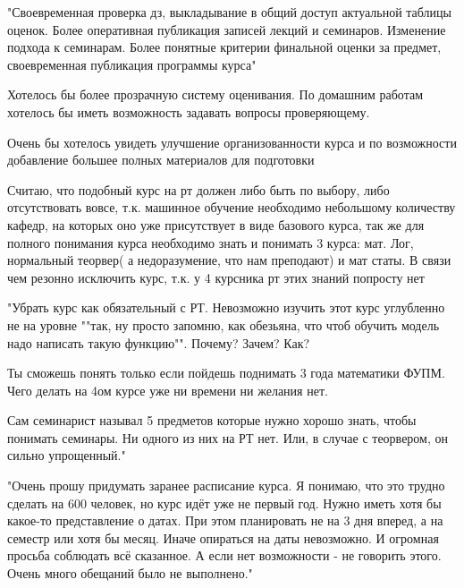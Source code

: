        \begin{commentbox}
            "Своевременная проверка дз, выкладывание в общий доступ актуальной таблицы оценок.
            Более оперативная публикация записей лекций и семинаров.
            Изменение подхода к семинарам.
            Более понятные критерии финальной оценки за предмет, своевременная публикация программы курса"
        \end{commentbox}

        \begin{commentbox}
            Хотелось бы более прозрачную систему оценивания. По домашним работам хотелось бы иметь возможность задавать вопросы проверяющему.
        \end{commentbox}

        \begin{commentbox}
            Очень бы хотелось увидеть улучшение  организованности курса и по возможности добавление большее полных материалов для подготовки
        \end{commentbox}

        \begin{commentbox}
            Считаю, что подобный курс на рт должен либо быть по выбору, либо отсутствовать вовсе, т.к. машинное обучение необходимо небольшому количеству кафедр, на которых оно уже присутствует в виде базового курса, так же для полного понимания курса необходимо знать и понимать 3 курса: мат. Лог, нормальный теорвер( а недоразумение, что нам преподают) и мат статы. В связи чем  резонно исключить курс, т.к. у 4 курсника рт этих знаний попросту нет
        \end{commentbox}

        \begin{commentbox}
            "Убрать курс как обязательный с РТ. Невозможно изучить этот курс углубленно не на уровне ""так, ну просто запомню, как обезьяна, что чтоб обучить модель надо написать такую функцию"". Почему? Зачем? Как? 

            Ты сможешь понять только если пойдешь поднимать 3 года математики ФУПМ. Чего делать на 4ом курсе уже ни времени ни желания нет.

            Сам семинарист называл 5 предметов которые нужно хорошо знать, чтобы понимать семинары. Ни одного из них на РТ нет. Или, в случае с теорвером, он сильно упрощенный."
        \end{commentbox}

        \begin{commentbox}
            "Очень прошу придумать заранее расписание курса. Я понимаю, что это трудно сделать на 600 человек, но курс идёт уже не первый год.
            Нужно иметь хотя бы какое-то представление о датах. При этом планировать не на 3 дня вперед, а на семестр или хотя бы месяц. Иначе опираться на даты невозможно.
            И огромная просьба соблюдать всё сказанное. А если нет возможности - не говорить этого. Очень много обещаний было не выполнено."
        \end{commentbox}